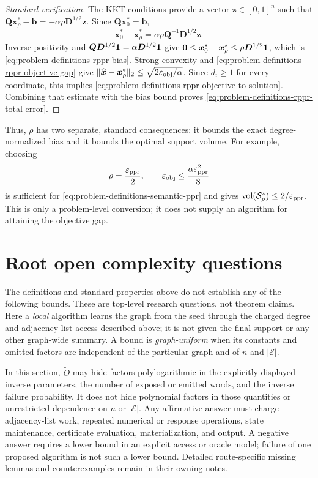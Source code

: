 \documentclass[11pt]{article}
\begin{document}
\begin{proof}[Standard verification]
The KKT conditions provide a vector $\bm{z}\in[0,1]^n$ such that
$\bm{Q}\bm{x}_\rho^*-\bm{b}
=-\alpha\rho \bm{D}^{1/2}\bm{z}$. Since
$\bm{Q}\bm{x}_0^*=\bm{b}$,
\[
    \bm{x}_0^*-\bm{x}_\rho^*
    =\alpha\rho \bm{Q}^{-1}\bm{D}^{1/2}\bm{z}.
\]
Inverse positivity and
$\bm{Q}\bm{D}^{1/2}\mathbf{1}=\alpha\bm{D}^{1/2}\mathbf{1}$ give
$\bm{0}\leq \bm{x}_0^*-\bm{x}_\rho^*
\leq\rho \bm{D}^{1/2}\mathbf{1}$, which is
\cref{eq:problem-definitions-rppr-bias}.  Strong convexity and
\cref{eq:problem-definitions-rppr-objective-gap} give
$\lVert\widehat{\bm{x}}-\bm{x}_\rho^*\rVert_2
\leq\sqrt{2\varepsilon_{\mathrm{obj}}/\alpha}$.  Since $d_i\geq1$ for every coordinate,
this implies \cref{eq:problem-definitions-rppr-objective-to-solution}.
Combining that estimate with the bias bound proves
\cref{eq:problem-definitions-rppr-total-error}.
\end{proof}

Thus, $\rho$ has two separate, standard consequences: it bounds the exact
degree-normalized bias and it bounds the optimal support volume.  For example,
choosing
\begin{equation}
    \rho=\frac{\varepsilon_{\mathrm{ppr}}}{2},
    \qquad
    \varepsilon_{\mathrm{obj}}\leq\frac{\alpha\varepsilon_{\mathrm{ppr}}^2}{8}
    \label{eq:problem-definitions-rppr-to-ppr-parameters}
\end{equation}
is sufficient for \cref{eq:problem-definitions-semantic-ppr} and gives
$\operatorname{vol}(\mathcal{S}_\rho^*)\leq2/\varepsilon_{\mathrm{ppr}}$.  This is only a problem-level
conversion; it does not supply an algorithm for attaining the objective gap.

\section{Root open complexity questions}
\label{sec:problem-definitions-open-questions}

The definitions and standard properties above do not establish any of the
following bounds.  These are top-level research questions, not theorem
claims.  Here a \emph{local} algorithm learns the graph from the seed through
the charged degree and adjacency-list access described above; it is not given
the final support or any other graph-wide summary.  A bound is
\emph{graph-uniform} when its constants and omitted factors are independent
of the particular graph and of $n$ and $|\mathcal E|$.

In this section, $\widetilde O$ may hide factors polylogarithmic in the
explicitly displayed inverse parameters, the number of exposed or emitted
words, and the inverse failure probability.  It does not hide polynomial
factors in those quantities or unrestricted dependence on $n$ or
$|\mathcal E|$.  Any affirmative answer must charge adjacency-list work,
repeated numerical or response operations, state maintenance, certificate
evaluation, materialization, and output.  A negative answer requires a lower
bound in an explicit access or oracle model; failure of one proposed
algorithm is not such a lower bound.  Detailed route-specific missing lemmas
and counterexamples remain in their owning notes.
\end{document}
